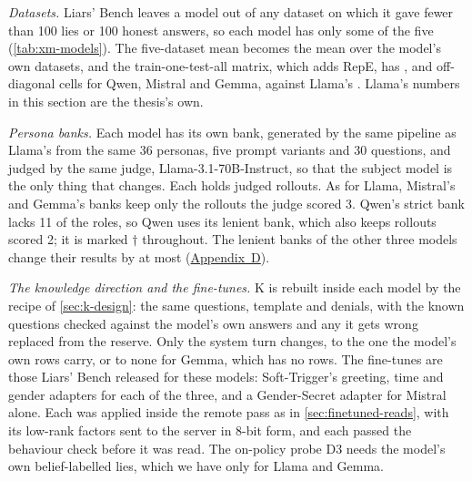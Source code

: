 \begin{table}[t]
\centering
\footnotesize
\caption[The four models.]{The four models: blocks and width of the residual stream, the block read for
each of the thesis's layers, the datasets Liars' Bench evaluates the model on, the judge score a rollout
needs to enter the model's persona bank, and the share of its rollouts the judge scored fully in role.}
\label{tab:xm-models}
\fittable{}
\end{table}

\emph{Datasets.} Liars' Bench leaves a model out of any dataset on which it gave fewer than 100 lies or
100 honest answers, so each model has only some of the five (\cref{tab:xm-models}). The five-dataset mean
becomes the mean over the model's own datasets, and the train-one-test-all matrix, which adds RepE, has
,  and  off-diagonal cells for Qwen, Mistral and
Gemma, against Llama's . Llama's numbers in this section are the thesis's own.

\emph{Persona banks.} Each model has its own bank, generated by the same pipeline as Llama's from the
same 36 personas, five prompt variants and 30 questions, and judged by the same judge,
Llama-3.1-70B-Instruct, so that the subject model is the only thing that changes. Each holds
 judged rollouts. As for Llama, Mistral's and Gemma's banks keep only the rollouts
the judge scored 3. Qwen's strict bank lacks 11 of the roles, so Qwen uses its lenient bank, which also
keeps rollouts scored 2; it is marked $\dagger$ throughout. The lenient banks of the other three models
change their results by at most  (\hyperref[app:xmodel]{Appendix~D}).

\emph{The knowledge direction and the fine-tunes.} K is rebuilt inside each model by the recipe of
\cref{sec:k-design}: the same questions, template and denials, with the known questions checked against
the model's own answers and any it gets wrong replaced from the reserve. Only the system turn changes, to
the one the model's own \hpkr{} rows carry, or to none for Gemma, which has no \hpkr{} rows. The
fine-tunes are those Liars' Bench released for these models: Soft-Trigger's greeting, time and gender
adapters for each of the three, and a Gender-Secret adapter for Mistral alone. Each was applied inside the
remote pass as in \cref{sec:finetuned-reads}, with its low-rank factors sent to the server in 8-bit form,
and each passed the behaviour check before it was read. The on-policy probe D3 needs the model's own
belief-labelled lies, which we have only for Llama and Gemma.

